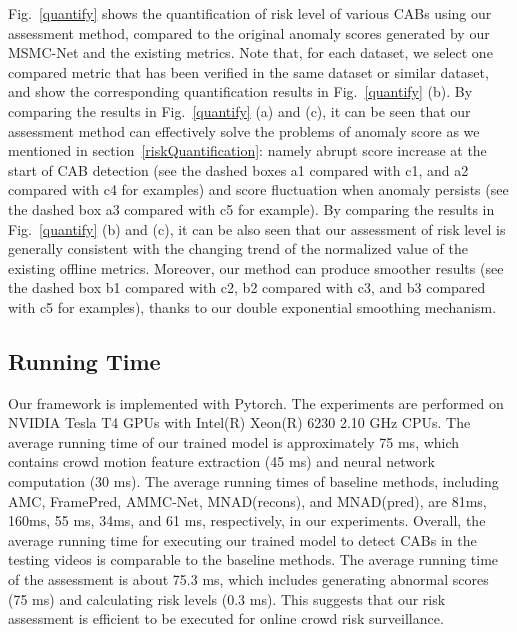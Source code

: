 \documentclass[journal]{IEEEtran}
\begin{document}
Fig.~\ref{quantify} shows the quantification of risk level of various CABs using our assessment method, compared to the original anomaly scores generated by our MSMC-Net and the existing metrics. Note that, for each dataset, we select one compared metric that has been verified in the same dataset or similar dataset, and show the corresponding quantification results in Fig.~\ref{quantify} (b). By comparing the results in Fig.~\ref{quantify} (a) and (c), it can be seen that our assessment method can effectively solve the problems of anomaly score as we mentioned in section~\ref{riskQuantification}: namely abrupt score increase at the start of CAB detection (see the dashed boxes a1 compared with c1, and a2 compared with c4 for examples) and score fluctuation when anomaly persists (see the dashed box a3 compared with c5 for example). By comparing the results in Fig.~\ref{quantify} (b) and (c), it can be also seen that our assessment of risk level is generally consistent with the changing trend of the normalized value of the existing offline metrics. Moreover, our method can produce smoother results (see the dashed box b1 compared with c2, b2 compared with c3, and b3 compared with c5 for examples), thanks to our double exponential smoothing mechanism. 


\subsection{Running Time}
Our framework is implemented with Pytorch. The experiments are performed on NVIDIA Tesla T4 GPUs with Intel(R) Xeon(R) 6230 2.10 GHz CPUs. 
The average running time of our trained model is approximately 75 ms, which contains crowd motion feature extraction (45 ms) and neural network computation (30 ms). The average running times of baseline methods, including AMC, FramePred, AMMC-Net, MNAD(recons), and MNAD(pred), are 81ms, 160ms, 55 ms, 34ms, and 61 ms, respectively, in our experiments. Overall, the average running time for executing our trained model to detect CABs in the testing videos is comparable to the baseline methods. 
The average running time of the assessment is about 75.3 ms, which includes generating abnormal scores (75 ms) and calculating risk levels (0.3 ms). This suggests that our risk assessment is efficient to be  executed for online crowd risk surveillance.
\end{document}
